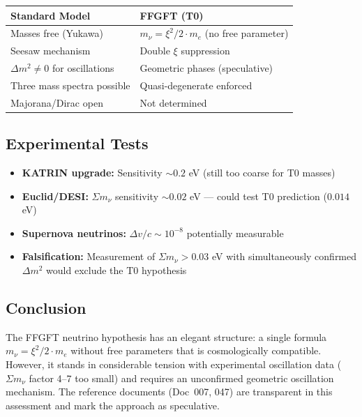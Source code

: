 	\begin{center}
		\begin{tabular}{p{}p{}}
			\textbf{Standard Model} & \textbf{FFGFT (T0)} \\
			\hline
			Masses free (Yukawa) & \(m_\nu = \xi^2/2 \cdot m_e\) (no free parameter) \\
			Seesaw mechanism & Double \(\xi\) suppression \\
			\(\Delta m^2 \neq 0\) for oscillations & Geometric phases (speculative) \\
			Three mass spectra possible & Quasi-degenerate enforced \\
			Majorana/Dirac open & Not determined \\
		\end{tabular}
	\end{center}
	
	\subsection*{Experimental Tests}
	
	\begin{itemize}
		\item \textbf{KATRIN upgrade:} Sensitivity \(\sim 0.2\) eV (still too coarse for T0 masses)
		\item \textbf{Euclid/DESI:} \(\Sigma m_\nu\) sensitivity \(\sim 0.02\) eV --- could test T0 prediction (\(0.014\) eV)
		\item \textbf{Supernova neutrinos:} \(\Delta v/c \sim 10^{-8}\) potentially measurable
		\item \textbf{Falsification:} Measurement of \(\Sigma m_\nu > 0.03\) eV with simultaneously confirmed \(\Delta m^2\) would exclude the T0 hypothesis
	\end{itemize}
	
	\subsection*{Conclusion}
	
	The FFGFT neutrino hypothesis has an elegant structure: a single formula \(m_\nu = \xi^2/2 \cdot m_e\) without free parameters that is cosmologically compatible. However, it stands in considerable tension with experimental oscillation data (\(\Sigma m_\nu\) factor 4--7 too small) and requires an unconfirmed geometric oscillation mechanism. The reference documents (Doc~007, 047) are transparent in this assessment and mark the approach as speculative.


